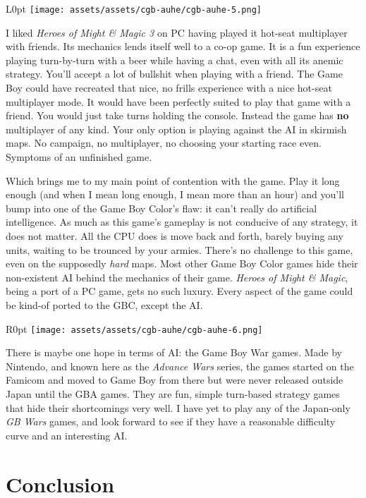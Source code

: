 \documentclass{book}
\begin{document}
\begin{wrapfigure}{L}{0pt} \texttt{[image: assets/assets/cgb-auhe/cgb-auhe-5.png]}\end{wrapfigure}
I liked \emph{Heroes of Might \& Magic 3} on PC having played it hot-seat multiplayer with friends. Its mechanics lends itself well to a co-op game. It is a fun experience playing turn-by-turn with a beer while having a chat, even with all its anemic strategy. You’ll accept a lot of bullshit when playing with a friend. The Game Boy could have recreated that nice, no frills experience with a nice hot-seat multiplayer mode. It would have been perfectly suited to play that game with a friend. You would just take turns holding the console. Instead the game has \textbf{no} multiplayer of any kind. Your only option is playing against the AI in skirmish maps. No campaign, no multiplayer, no choosing your starting race even. Symptoms of an unfinished game.

Which brings me to my main point of contention with the game. Play it long enough (and when I mean long enough, I mean more than an hour) and you’ll bump into one of the Game Boy Color’s flaw: it can’t really do artificial intelligence. As much as this game’s gameplay is not conducive of any strategy, it does not matter. All the CPU does is move back and forth, barely buying any units, waiting to be trounced by your armies. There’s no challenge to this game, even on the supposedly \emph{hard} maps. Most other Game Boy Color games hide their non-existent AI behind the mechanics of their game. \emph{Heroes of Might \& Magic}, being a port of a PC game, gets no such luxury. Every aspect of the game could be kind-of ported to the GBC, except the AI.

\begin{wrapfigure}{R}{0pt} \texttt{[image: assets/assets/cgb-auhe/cgb-auhe-6.png]}\end{wrapfigure}
There is maybe one hope in terms of AI: the Game Boy War games. Made by Nintendo, and known here as the \emph{Advance Wars} series, the games started on the Famicom and moved to Game Boy from there but were never released outside Japan until the GBA games. They are fun, simple turn-based strategy games that hide their shortcomings very well. I have yet to play any of the Japan-only \emph{GB Wars} games, and look forward to see if they have a reasonable difficulty curve and an interesting AI.

\FloatBarrier\needspace{5pt}\section*{Conclusion}\nopagebreak[4]
\end{document}
